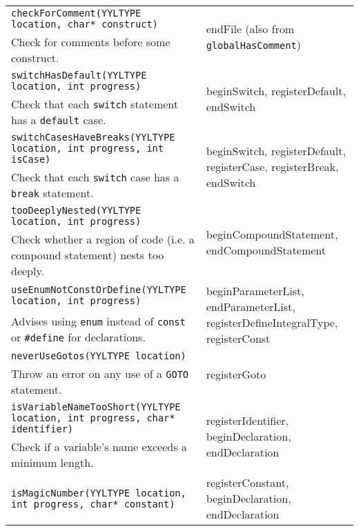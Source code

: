 \documentclass[12pt]{report}
\begin{document}
\begin{longtable}{p{10cm} p{\saxColSize}}
		\lstinline!checkForComment(YYLTYPE location, char* construct)!  & \multirow{2}{\saxColSize}{endFile (also from \lstinline!globalHasComment!)} \\*
			 Check for comments before some construct. \vspace{\vertSize} \\
		\lstinline!switchHasDefault(YYLTYPE location, int progress)! & \multirow{2}{\saxColSize}{beginSwitch, registerDefault, endSwitch} \\*
		 Check that each \lstinline!switch! statement has a \lstinline!default! case. \vspace{\vertSize} \\
		\lstinline!switchCasesHaveBreaks(YYLTYPE location, int progress, int isCase)! & \multirow{2}{\saxColSize}{beginSwitch, registerDefault, registerCase, registerBreak, endSwitch} \\*
		 Check that each \lstinline!switch! case has a \lstinline!break! statement. \vspace{\vertSize} \\
		\lstinline!tooDeeplyNested(YYLTYPE location, int progress)! & \multirow{2}{\saxColSize}{beginCompoundStatement, endCompoundStatement} \\*
		 Check whether a region of code (i.e. a compound statement) nests too deeply. \vspace{\vertSize} \\
		\lstinline!useEnumNotConstOrDefine(YYLTYPE location, int progress)! & \multirow{2}{\saxColSize}{beginParameterList, endParameterList, registerDefineIntegralType, registerConst} \\*
			 Advises using \lstinline!enum! instead of \lstinline!const! or \lstinline!#define! for declarations. \vspace{\vertSize} \\
		\lstinline!neverUseGotos(YYLTYPE location)! & \multirow{2}{\saxColSize}{registerGoto} \\*
			 Throw an error on any use of a \lstinline!GOTO! statement. \vspace{\vertSize} \\
		\lstinline!isVariableNameTooShort(YYLTYPE location, int progress, char* identifier)! & \multirow{2}{\saxColSize}{registerIdentifier, beginDeclaration, endDeclaration} \\*
		 Check if a variable's name exceeds a minimum length. \vspace{\vertSize} \\
		\lstinline!isMagicNumber(YYLTYPE location, int progress, char* constant)! & \multirow{2}{\saxColSize}{registerConstant, beginDeclaration, endDeclaration} \\*

\end{longtable}
\end{document}
